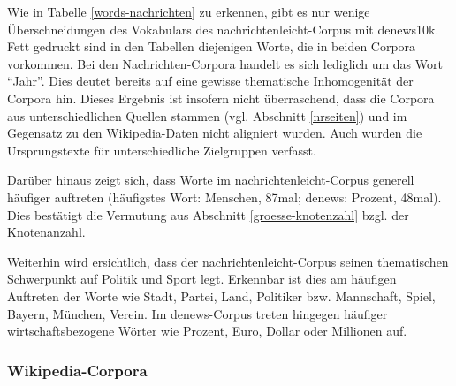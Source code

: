 \documentclass[11pt, a4paper]{article}
\begin{document}
Wie in Tabelle \ref{words-nachrichten} zu erkennen, gibt es nur wenige
Überschneidungen des Vokabulars des nachrichtenleicht-Corpus mit denews10k.
Fett gedruckt sind in den Tabellen diejenigen Worte, die in beiden Corpora
vorkommen.
Bei den Nachrichten-Corpora handelt es sich lediglich um das Wort "`Jahr"'.
Dies deutet bereits auf eine gewisse thematische Inhomogenität der Corpora hin.
Dieses Ergebnis ist insofern nicht überraschend, dass die Corpora aus
unterschiedlichen Quellen stammen (vgl. Abschnitt \ref{nrseiten}) und
im Gegensatz zu den Wikipedia-Daten nicht aligniert wurden.
Auch wurden die Ursprungstexte für unterschiedliche Zielgruppen verfasst.

Darüber hinaus zeigt sich, dass Worte im nachrichtenleicht-Corpus generell
häufiger auftreten (häufigstes Wort: Menschen, 87mal; denews: Prozent, 48mal).
Dies bestätigt die Vermutung aus Abschnitt \ref{groesse-knotenzahl} bzgl. der
Knotenanzahl.

Weiterhin wird ersichtlich, dass der nachrichtenleicht-Corpus seinen
thematischen Schwerpunkt auf Politik und Sport legt.
Erkennbar ist dies am häufigen Auftreten der Worte wie Stadt, Partei, Land,
Politiker bzw. Mannschaft, Spiel, Bayern, München, Verein.
Im denews-Corpus treten hingegen häufiger wirtschaftsbezogene Wörter wie Prozent,
Euro, Dollar oder Millionen auf.


\subsubsection{Wikipedia-Corpora}
\end{document}

